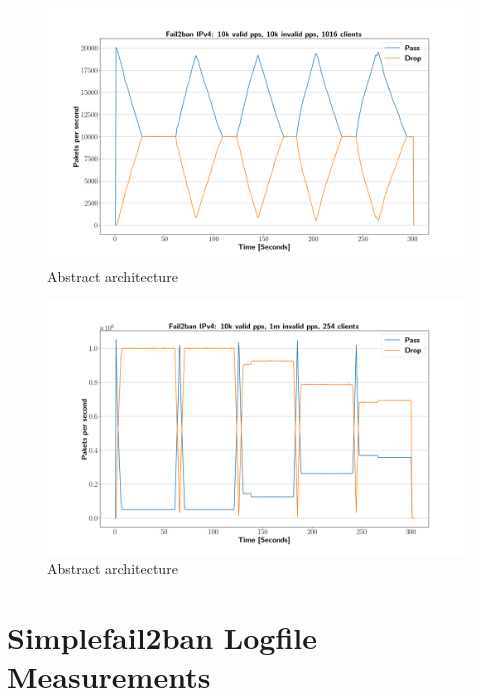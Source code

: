 \begin{figure}[p]
	\label{fig:fail2ban:10k}
    \centerline{\includegraphics[width=1.2\textwidth]{images/fail2ban_v10k_iv10k_c1016.png}}
    \caption[Fail2Ban Replication Measurements 1]{Abstract architecture }
\end{figure}

\begin{figure}[p]
	\label{fig:fail2ban:1m}
    \centerline{\includegraphics[width=1.2\textwidth]{images/fail2ban_v50k_iv1m_c254.png}}
    \caption[IPC Architecture]{Abstract architecture }
\end{figure}

\section{Simplefail2ban Logfile Measurements}

